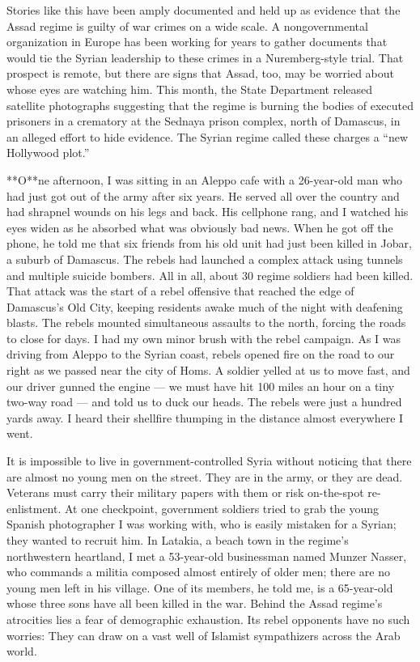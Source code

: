 Stories like this have been amply documented and held up as evidence
that the Assad regime is guilty of war crimes on a wide scale. A
nongovernmental organization in Europe has been working for years to
gather documents that would tie the Syrian leadership to these crimes in
a Nuremberg-style trial. That prospect is remote, but there are signs
that Assad, too, may be worried about whose eyes are watching him. This
month, the State Department released satellite photographs suggesting
that the regime is burning the bodies of executed prisoners in a
crematory at the Sednaya prison complex, north of Damascus, in an
alleged effort to hide evidence. The Syrian regime called these charges
a ``new Hollywood plot.''

**O**ne afternoon, I was sitting in an Aleppo cafe with a 26-year-old
man who had just got out of the army after six years. He served all over
the country and had shrapnel wounds on his legs and back. His cellphone
rang, and I watched his eyes widen as he absorbed what was obviously bad
news. When he got off the phone, he told me that six friends from his
old unit had just been killed in Jobar, a suburb of Damascus. The rebels
had launched a complex attack using tunnels and multiple suicide
bombers. All in all, about 30 regime soldiers had been killed. That
attack was the start of a rebel offensive that reached the edge of
Damascus's Old City, keeping residents awake much of the night with
deafening blasts. The rebels mounted simultaneous assaults to the north,
forcing the roads to close for days. I had my own minor brush with the
rebel campaign. As I was driving from Aleppo to the Syrian coast, rebels
opened fire on the road to our right as we passed near the city of Homs.
A soldier yelled at us to move fast, and our driver gunned the engine
--- we must have hit 100 miles an hour on a tiny two-way road --- and
told us to duck our heads. The rebels were just a hundred yards away. I
heard their shellfire thumping in the distance almost everywhere I went.

It is impossible to live in government-controlled Syria without noticing
that there are almost no young men on the street. They are in the army,
or they are dead. Veterans must carry their military papers with them or
risk on-the-spot re-enlistment. At one checkpoint, government soldiers
tried to grab the young Spanish photographer I was working with, who is
easily mistaken for a Syrian; they wanted to recruit him. In Latakia, a
beach town in the regime's northwestern heartland, I met a 53-year-old
businessman named Munzer Nasser, who commands a militia composed almost
entirely of older men; there are no young men left in his village. One
of its members, he told me, is a 65-year-old whose three sons have all
been killed in the war. Behind the Assad regime's atrocities lies a fear
of demographic exhaustion. Its rebel opponents have no such worries:
They can draw on a vast well of Islamist sympathizers across the Arab
world.

